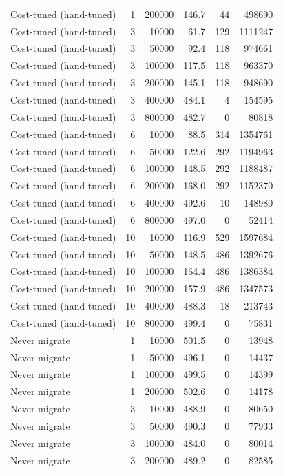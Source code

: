 \begin{table}[h]
\begin{tabular}{@{}lrrrrr@{}}
Cost-tuned (hand-tuned) & 1 & 200000 & 146.7 & 44 & 498690 \\
Cost-tuned (hand-tuned) & 3 & 10000 & 61.7 & 129 & 1111247 \\
Cost-tuned (hand-tuned) & 3 & 50000 & 92.4 & 118 & 974661 \\
Cost-tuned (hand-tuned) & 3 & 100000 & 117.5 & 118 & 963370 \\
Cost-tuned (hand-tuned) & 3 & 200000 & 145.1 & 118 & 948690 \\
Cost-tuned (hand-tuned) & 3 & 400000 & 484.1 & 4 & 154595 \\
Cost-tuned (hand-tuned) & 3 & 800000 & 482.7 & 0 & 80818 \\
Cost-tuned (hand-tuned) & 6 & 10000 & 88.5 & 314 & 1354761 \\
Cost-tuned (hand-tuned) & 6 & 50000 & 122.6 & 292 & 1194963 \\
Cost-tuned (hand-tuned) & 6 & 100000 & 148.5 & 292 & 1188487 \\
Cost-tuned (hand-tuned) & 6 & 200000 & 168.0 & 292 & 1152370 \\
Cost-tuned (hand-tuned) & 6 & 400000 & 492.6 & 10 & 148980 \\
Cost-tuned (hand-tuned) & 6 & 800000 & 497.0 & 0 & 52414 \\
Cost-tuned (hand-tuned) & 10 & 10000 & 116.9 & 529 & 1597684 \\
Cost-tuned (hand-tuned) & 10 & 50000 & 148.5 & 486 & 1392676 \\
Cost-tuned (hand-tuned) & 10 & 100000 & 164.4 & 486 & 1386384 \\
Cost-tuned (hand-tuned) & 10 & 200000 & 157.9 & 486 & 1347573 \\
Cost-tuned (hand-tuned) & 10 & 400000 & 488.3 & 18 & 213743 \\
Cost-tuned (hand-tuned) & 10 & 800000 & 499.4 & 0 & 75831 \\
Never migrate & 1 & 10000 & 501.5 & 0 & 13948 \\
Never migrate & 1 & 50000 & 496.1 & 0 & 14437 \\
Never migrate & 1 & 100000 & 499.5 & 0 & 14399 \\
Never migrate & 1 & 200000 & 502.6 & 0 & 14178 \\
Never migrate & 3 & 10000 & 488.9 & 0 & 80650 \\
Never migrate & 3 & 50000 & 490.3 & 0 & 77933 \\
Never migrate & 3 & 100000 & 484.0 & 0 & 80014 \\
Never migrate & 3 & 200000 & 489.2 & 0 & 82585 \\

\end{tabular}
\end{table}
